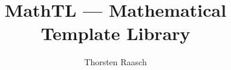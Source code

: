 \documentclass{article}
\begin{document}
\title{MathTL --- Mathematical Template Library}
\author{Thorsten Raasch}
\maketitle
\end{document}
